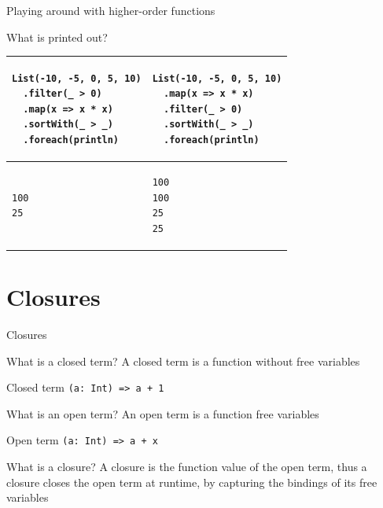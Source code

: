 \begin{frame}[fragile]{Playing around with higher-order functions}
\begin{exampleblock}{What is printed out?}
\begin{tabular}{l|l}
\begin{lstlisting}
List(-10, -5, 0, 5, 10)
  .filter(_ > 0)
  .map(x => x * x)
  .sortWith(_ > _)
  .foreach(println)
\end{lstlisting}
&
\begin{lstlisting}
List(-10, -5, 0, 5, 10)
  .map(x => x * x)
  .filter(_ > 0)
  .sortWith(_ > _)
  .foreach(println)
\end{lstlisting}\\
\hline
\pause
\begin{lstlisting}
100
25
\end{lstlisting}
&
\begin{lstlisting}
100
100
25
25
\end{lstlisting}
\end{tabular}
\end{exampleblock}
\end{frame}

\section{Closures}
\begin{frame}[fragile]{Closures}
\begin{block}{What is a closed term?}
A closed term is a function \alert{without} free variables
\end{block}
\pause
\begin{exampleblock}{Closed term}
\lstinline!(a: Int) => a + 1!
\end{exampleblock}
\pause
\begin{block}{What is an open term?}
An open term is a function  free variables
\end{block}
\pause
\begin{exampleblock}{Open term}
\lstinline!(a: Int) => a + x!
\end{exampleblock}
\pause
\begin{block}{What is a closure?}
A closure is the function value of the open term, thus a closure closes the open
term at runtime, by capturing the bindings of its free variables
\end{block}
\end{frame}

